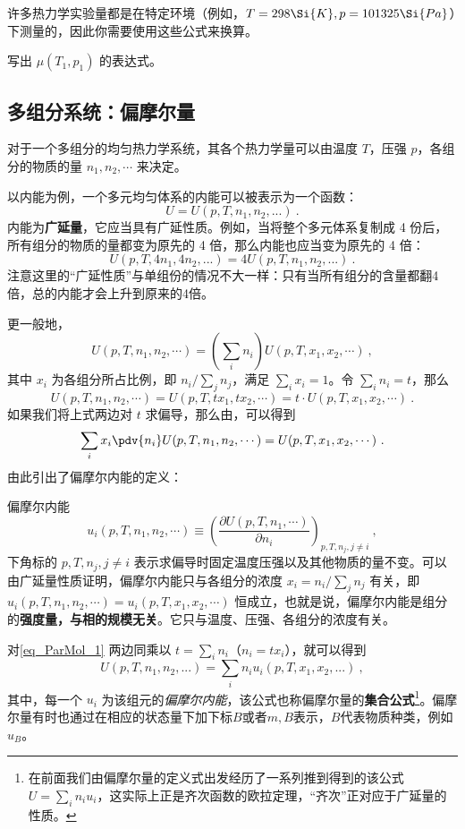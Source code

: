 许多热力学实验量都是在特定环境（例如，$T = 298 \Si{K}, p = 101325\Si{Pa}$）下测量的，因此你需要使用这些公式来换算。

\begin{exercise}{}
写出 $\mu(T_1,p_1)$ 的表达式。
\end{exercise}

\subsection{多组分系统：偏摩尔量}
对于一个多组分的均匀热力学系统，其各个热力学量可以由温度 $T$，压强 $p$，各组分的物质的量 $n_1,n_2,\cdots $ 来决定。

以内能为例，一个多元均匀体系的内能可以被表示为一个函数：
\begin{equation}
U = U (p, T, n_1, n_2, ...)~.
\end{equation}
内能为\textbf{广延量}，它应当具有广延性质。例如，当将整个多元体系复制成 4 份后，所有组分的物质的量都变为原先的 4 倍，那么内能也应当变为原先的 4 倍：
$$ U (p, T, 4n_1, 4n_2, ...) = 4U (p, T, n_1, n_2, ...)~.$$
注意这里的“广延性质”与单组份的情况不大一样：只有当所有组分的含量都翻4倍，总的内能才会上升到原来的4倍。

更一般地，
\begin{equation}
U(p,T,n_1,n_2,\cdots )=\left(\sum_i n_i\right) U(p,T,x_1,x_2,\cdots)~,
\end{equation}
其中 $x_i$ 为各组分所占比例，即 $n_i/\sum_j n_j$，满足 $\sum_i x_i=1$。令 $\sum_i n_i=t$，那么
\begin{equation}
U(p,T,n_1,n_2,\cdots)=U(p,T,tx_1,tx_2,\cdots)=t\cdot U(p,T,x_1,x_2,\cdots)~.
\end{equation}
如果我们将上式两边对 $t$ 求偏导，那么由，可以得到
\begin{equation}\label{eq_ParMol_1}
\sum_i x_i \pdv{n_i} U(p,T,n_1,n_2,\cdots )=U(p,T,x_1,x_2,\cdots)~.
\end{equation}
由此引出了偏摩尔内能的定义：
\begin{definition}{偏摩尔内能}
\begin{equation}
u_i(p,T,n_1,n_2,\cdots )\equiv \left(\frac{\partial U(p,T,n_1,\cdots)}{\partial n_i}\right)_{p,T,n_j,j\neq i}~,
\end{equation}
下角标的 $p,T,n_j,j\neq i$ 表示求偏导时固定温度压强以及其他物质的量不变。可以由广延量性质证明，偏摩尔内能只与各组分的浓度 $x_i=n_i/\sum_j n_j$ 有关，即 $u_i(p,T,n_1,n_2,\cdots)=u_i(p,T,x_1,x_2,\cdots)$ 恒成立，也就是说，偏摩尔内能是组分的\textbf{强度量，与相的规模无关}。它只与温度、压强、各组分的浓度有关。
\end{definition}
对\autoref{eq_ParMol_1} 两边同乘以 $t=\sum_i n_i$（$n_i=tx_i$），就可以得到
\begin{equation}\label{eq_ParMol_2}
U (p, T, n_1, n_2, ...) = \sum_i n_i u_i(p, T, x_1, x_2, ...)~,
\end{equation}
其中，每一个 $u_i$ 为该组元的\textsl{偏摩尔内能}，该公式也称偏摩尔量的\textbf{集合公式}\footnote{在前面我们由偏摩尔量的定义式出发经历了一系列推到得到的该公式 $U=\sum_i n_i u_i$，这实际上正是齐次函数的欧拉定理，“齐次”正对应于广延量的性质。}。偏摩尔量有时也通过在相应的状态量下加下标$B$或者$m,B$表示，$B$代表物质种类，例如$u_B$。

